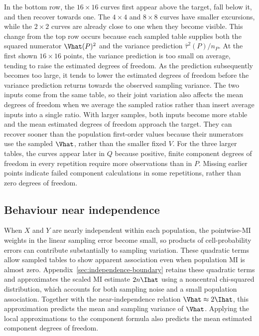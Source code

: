 In the bottom row, the \(16\times16\) curves first appear above the target,
fall below it, and then recover towards one. The \(4\times4\) and
\(8\times8\) curves have smaller excursions, while the \(2\times2\)
curves are already close to one when they become visible. This change
from the top row occurs because each sampled table supplies both the
squared numerator \(\Vhat(P)^2\) and the variance prediction
\(\widehat\tau^2(P)/n_P\). At the first shown \(16\times16\) points, the variance prediction is
too small on average, tending to raise the estimated degrees of freedom.
As the prediction subsequently becomes too large, it tends to lower
the estimated degrees of freedom before the variance prediction returns
towards the observed sampling variance. The two inputs come from the same table, so their joint variation also
affects the mean degrees of freedom when we average the sampled ratios
rather than insert average inputs into a single ratio.
With larger samples, both inputs become more stable and the mean estimated
degrees of freedom approach the target. They can recover sooner than the
population first-order values because their numerators use the sampled
\(\Vhat\), rather than the smaller fixed \(V\). For the three larger
tables, the curves appear later in \(Q\) because positive, finite component
degrees of freedom in every repetition require more observations than in \(P\).
Missing earlier points indicate failed component calculations in some
repetitions, rather than zero degrees of freedom.

\FloatBarrier

\subsection{Behaviour near independence}

When \(X\) and \(Y\) are nearly independent within each population, the
pointwise-MI weights in the linear sampling error become small, so products
of cell-probability errors can contribute substantially to sampling variation. These quadratic terms allow sampled
tables to show apparent association even when population MI is almost
zero. Appendix~\ref{sec:independence-boundary} retains these quadratic terms
and approximates the scaled MI estimate \(2n\Ihat\) using a noncentral
chi-squared distribution, which accounts for both sampling noise and a
small population association. Together with the near-independence relation
\(\Vhat\approx2\Ihat\), this approximation predicts the mean and
sampling variance of \(\Vhat\). Applying the local approximations to the
component formula also predicts the mean estimated component degrees of
freedom.

